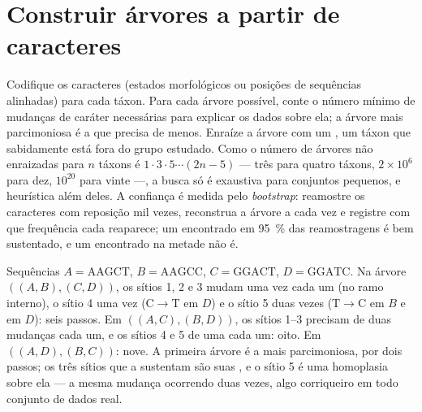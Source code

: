 \section{Construir árvores a partir de caracteres}

\begin{method}[Parcimônia]\label{meth:b2:phylogenetic-trees:parsimony}
Codifique os caracteres (estados morfológicos ou posições de sequências
alinhadas) para cada táxon. Para cada árvore possível, conte o número
mínimo de mudanças de caráter necessárias para explicar os dados sobre
ela; a árvore mais parcimoniosa é a que precisa de menos. Enraíze a
árvore com um \emph{}, um táxon que sabidamente está fora do
grupo estudado. Como o número de árvores não enraizadas para $n$ táxons é $1\cdot 3\cdot
5\cdots(2n - 5)$ --- três para quatro táxons, $2\times 10^{6}$ para
dez, $10^{20}$ para vinte ---, a busca só é exaustiva para conjuntos
pequenos, e heurística além deles. A confiança é medida pelo
\emph{bootstrap}: reamostre os caracteres com reposição mil vezes,
reconstrua a árvore a cada vez e registre com que frequência cada 
reaparece; um  encontrado em \qty{95}{\%} das reamostragens é bem
sustentado, e um encontrado na metade não é.
\end{method}

\begin{example}\label{ex:b2:phylogenetic-trees:parsimony}
Sequências $A = \mathrm{AAGCT}$, $B = \mathrm{AAGCC}$, $C =
\mathrm{GGACT}$, $D = \mathrm{GGATC}$. Na árvore $((A,B),(C,D))$, os
sítios 1, 2 e 3 mudam uma vez cada um (no ramo interno), o sítio 4
uma vez ($\mathrm{C}\to\mathrm{T}$ em $D$) e o sítio 5 duas vezes
($\mathrm{T}\to\mathrm{C}$ em $B$ e em $D$): seis passos. Em
$((A,C),(B,D))$, os sítios 1--3 precisam de duas mudanças cada um, e os
sítios 4 e 5 de uma cada um: oito. Em $((A,D),(B,C))$: nove. A primeira
árvore é a mais parcimoniosa, por dois passos; os três sítios que a
sustentam são suas , e o sítio 5 é uma homoplasia sobre ela
--- a mesma mudança ocorrendo duas vezes, algo corriqueiro em todo
conjunto de dados real.
\end{example}

